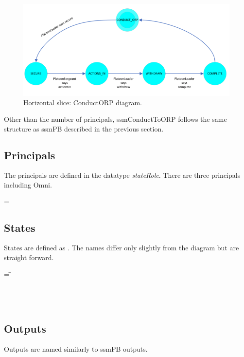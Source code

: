 \documentclass[../../main/main.tex]{subfiles}
\begin{document}
\begin{figure}[h!]
\centering
\includegraphics[width=\textwidth]{../figures/ssmConductORPDiagram}
\caption{\label{ssmConductORPDiagram2} Horizontal slice: ConductORP diagram.}
\end{figure}


Other than the number of principals, ssmConductToORP follows the same structure as ssmPB described in the previous section.  

\subsection{Principals}
The principals are defined in the datatype \textit{stateRole}.  There are three principals including Omni.

 =  \HOLTokenBar{}  \HOLTokenBar{} 

\subsection{States}
States are defined as .  The names differ only slightly from the diagram but are straight forward.  
\begin{tabbing}
 = \= \\
					\>\HOLTokenBar{}  \\
					\>\HOLTokenBar{}  \\
					\>\HOLTokenBar{} \\
        					\>\HOLTokenBar{} 
\end{tabbing}

\subsection{Outputs}
Outputs are named similarly to ssmPB outputs.
\end{document}
